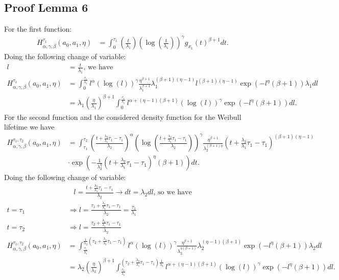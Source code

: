 \documentclass{article}
\begin{document}
\subsection{Proof Lemma 6}
For the first function:
\begin{align*}
H_{\alpha,\gamma,\beta}^{\tau_1}(a_0,a_1,\eta)&=\int_{0}^{\tau_1}\left(\frac{t}{\lambda_1}\right)\left(\log\left(\frac{t}{\lambda_1}\right)\right)^{\gamma}g_{x_1}(t)^{\beta+1}dt.
\end{align*}  
Doing the following change of variable:
\begin{align*}
 l&=\frac{t}{\lambda_1} \text{, we have}
\\
H_{\alpha,\gamma,\beta}^{\tau_1}(a_0,a_1,\eta)&=\int_{0}^{\frac{\tau_1}{\lambda_1}} l^{\alpha}  \left(\log\left(l\right)\right)^{\gamma}\frac{\eta^{\beta+1}}{\lambda_1^{\beta+1}}\lambda_1^{(\beta+1)(\eta-1)} l^{(\beta+1)(\eta-1)}\exp\left(-l^{\eta}(\beta+1)\right)\lambda_1dl
\\
&=\lambda_1\left(\frac{\eta}{\lambda_1}\right)^{\beta+1}\int_{0}^{\frac{\tau_1}{\lambda_1}}l^{\alpha+(\eta-1)(\beta+1)}\left(\log\left(l\right)\right)^{\gamma}\exp\left(-l^{\eta}(\beta+1)\right)dl.
\end{align*}  
For the second function and the considered density function for the Weibull lifetime we have
\begin{align*}
H_{\alpha,\gamma,\beta}^{\tau_1,\tau_2}(a_0,a_1,\eta)&=\int_{\tau_1}^{\tau_2}\left(\frac{t+\frac{\lambda_2}{\lambda_1}\tau_1-\tau_1}{\lambda_2}\right)^{\alpha}\left(\log\left(\frac{t+\frac{\lambda_2}{\lambda_1}\tau_1-\tau_1}{\lambda_2}\right)\right)^{\gamma}\frac{\eta^{\beta+1}}{\lambda_2^{(\beta+1)\eta}}\left(t+\frac{\lambda_2}{\lambda_1}\tau_1-\tau_1\right)^{(\beta+1)(\eta-1)}
\\
& \cdot \exp\left(-\frac{1}{\lambda_2^{\eta}}\left(t+\frac{\lambda_2}{\lambda_1}\tau_1-\tau_1\right)^{\eta}(\beta+1)\right)dt.
\end{align*}
Doing the following change of variable:
\begin{align*}
l=\frac{t+\frac{\lambda_2}{\lambda_1}\tau_1-\tau_1}{\lambda_2} \rightarrow dt=\lambda_2dl \text{, so we have}
\end{align*}
\begin{align*}
t=\tau_1& \Rightarrow l=\frac{\tau_1+\frac{\lambda_2}{\lambda_1}\tau_1-\tau_1}{\lambda_2}=\frac{\tau_1}{\lambda_1}
\\
t=\tau_2&  \Rightarrow l=\frac{\tau_2+\frac{\lambda_2}{\lambda_1}\tau_1-\tau_1}{\lambda_2}
\\
H_{\alpha,\gamma,\beta}^{\tau_1,\tau_2}(a_0,a_1,\eta)&=\int_{\frac{\tau_1}{\lambda_1}}^{\frac{1}{\lambda_2}\left(\tau_2+\frac{\lambda_2}{\lambda_1}\tau_1-\tau_1\right)}l^{\alpha}\left(\log\left(l\right)\right)^{\gamma}\frac{\eta^{\beta+1}}{\lambda_2^{\eta(\beta+1)}}\lambda_2^{(\eta-1)(\beta+1)}\exp\left(-l^{\eta}(\beta+1)\right)\lambda_2dl
\\
&=\lambda_2\left(\frac{\eta}{\lambda_2}\right)^{\beta+1}\int_{\frac{\tau_1}{\lambda_1}}^{\left(\tau_2+\frac{\lambda_2}{\lambda_1}\tau_1-\tau_1\right)\frac{1}{\lambda_2}}l^{\alpha+(\eta-1)(\beta+1)}\left(\log\left(l\right)\right)^{\gamma}\exp\left(-l^{\eta}(\beta+1)\right)dl.
\end{align*}  
\end{document}
